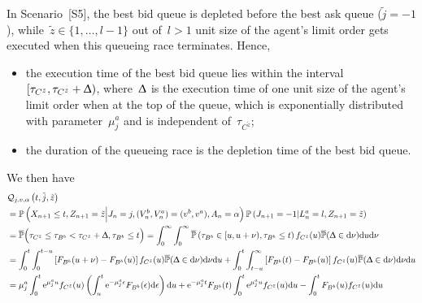 \documentclass{amsart}[11pt]
\numberwithin{equation}{section}
\theoremstyle{definition}
\newcommand{\PP}{\mathbb{P}}
\newcommand{\D}{\mathrm{d}}
\newcommand{\E}{\mathrm{e}}
\newcommand{\Qq}{\mathcal{Q}}
\begin{document}
\begin{appendix}
In Scenario~[S5], the best bid queue is depleted before the best ask queue ($\tilde{j} = -1$),
while~$\tilde{z}\in\{1, \dots, {l}-1\}$ out of~${l}>1$ unit size of the agent's limit order gets executed when this queueing race terminates.
Hence,
\begin{itemize}
\item the execution time of the best bid queue lies within the interval~$[\tau_{C^{\tilde{z}}}, \tau_{C^{\tilde{z}}}+\Updelta)$,
where~$\Updelta$ is the execution time of one unit size of the agent's limit order when at the top of the queue,
which is exponentially distributed with parameter~$\mu_j^a$ and is independent of~$\tau_{C^{\tilde{z}}}$;
\item the duration of the queueing race is the depletion time of the best bid queue.
\end{itemize}
We then have
\begin{align*}
&{\Qq}_{j, v, \alpha}\left(t, \tilde{j}, \tilde{z}\right)\\
& = {\PP}\left(X_{n+1}\leq t, Z_{n+1} = \tilde{z} \Big\lvert J_n = {j}, (V^b_n, V^a_n) = ({v}^b, {v}^a), A_n = \alpha\right)
{\PP}\left(J_{n+1} = -1\lvert L_n^a = {l}, Z_{n+1} = \tilde{z}\right)\\
&=\overline{\PP}\Big(
\tau_{{C}^{\tilde{z}}} \leq \tau_{{B}^b} <\tau_{{C}^{\tilde{z}}}+\Updelta, \tau_{B^b}\leq t
\Big)
=\int_0^\infty\int_0^\infty
\overline{\PP}\left(\tau_{{B}^b}\in[u, u+\nu), \tau_{{B}^b}\leq t\right)
f_{{C}^{\tilde{z}}}(u)\overline{\PP}(\Updelta \in \D\nu)\D u\D \nu\\
& = \int_0^t \int_0^{t-u}\left[F_{{B}^b}(u+\nu) - F_{{B}^b}(u)\right]
f_{{C}^{\tilde{z}}}(u) \overline{\PP}(\Updelta \in \D\nu)\D \nu\D u
+ \int_0^t \int_{t-u}^\infty \left[F_{{B}^b}(t)-F_{{B}^b}(u)\right]
f_{{C}^{\tilde{z}}}(u)\overline{\PP}(\Updelta \in \D\nu)\D \nu\D u\\
& = \mu_{{j}}^a\int_0^t \E^{\mu_{{j}}^a u}f_{{C}^{\tilde{z}}}(u)
\left(\int_u^t \E^{-\mu_{{j}}^a \epsilon} F_{{B}^b}(\epsilon)\D \epsilon\right)\D u
+
\E^{-\mu_{{j}}^a t}F_{{B}^b}(t)\int_0^t \E^{\mu_{{j}}^a u}f_{{C}^{\tilde{z}}}(u)\D u
-
\int_0^t F_{{B}^b}(u) f_{{C}^{\tilde{z}}}(u)\D u\\

\end{align*}
\end{appendix}
\end{document}
